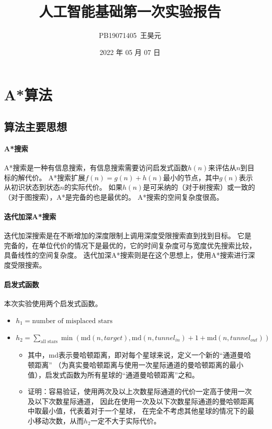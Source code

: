 \documentclass[UTF8]{article}
\title{人工智能基础第一次实验报告}
\author{PB19071405\ 王昊元}
\date{2022 年 05 月 07 日}
\begin{document}
    \maketitle
    
    \section{A*算法}
    \subsection{算法主要思想}
    \paragraph{A*搜索}
    A*搜索是一种有信息搜索，有信息搜索需要访问启发式函数$h(n)$来评估从$n$到目标的解代价。
    A*搜索扩展$f(n) = g(n) + h(n)$最小的节点，其中$g(n)$表示从初识状态到状态$n$的实际代价。
    如果$h(n)$是可采纳的（对于树搜索）或一致的（对于图搜索），A*是完备的也是最优的。
    A*搜索的空间复杂度很高。
    \paragraph{迭代加深A*搜索}
    迭代加深搜索是在不断增加的深度限制上调用深度受限搜索直到找到目标。
    它是完备的，在单位代价的情况下是最优的，它的时间复杂度可与宽度优先搜索比较，具备线性的空间复杂度。
    迭代加深A*搜索则是在这个思想上，使用A*搜索进行深度受限搜索。
    \paragraph{启发式函数}
    本次实验使用两个启发式函数。
    \begin{itemize}
        \item $h_1 = \text{number\ of\ misplaced\ stars}$
        \item $h_2 = \sum_{\text{all stars}} \min(\text{md}(n, target), \text{md}(n, tunnel_{in}) + 1 + \text{md}(n, tunnel_{out}))$
        \begin{itemize}
            \item 其中，md表示曼哈顿距离，即对每个星球来说，定义一个新的``通道曼哈顿距离''
            （为真实曼哈顿距离与使用一次星际通道的曼哈顿距离的最小值），启发式函数为所有星球的``通道曼哈顿距离''之和。
            \item 证明：容易验证，使用两次及以上次数星际通道的代价一定高于使用一次及以下次数星际通道，
            因此在使用一次及以下次数星际通道的曼哈顿距离中取最小值，代表着对于一个星球，
            在完全不考虑其他星球的情况下的最小移动次数，从而$h_2$一定不大于实际代价。
        \end{itemize}
    \end{itemize}
\end{document}
